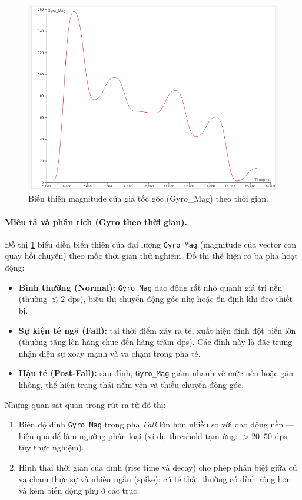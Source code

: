 \begin{figure}[H]
    \centering
    \includegraphics[width=0.95\linewidth]{figures/gyro_time.png}
    \caption{Biến thiên magnitude của gia tốc góc (Gyro\_Mag) theo thời gian.}
    \label{fig:gyro_time}
\end{figure}

\paragraph{Miêu tả và phân tích (Gyro theo thời gian).}
Đồ thị \ref{fig:gyro_time} biểu diễn biến thiên của đại lượng \texttt{Gyro\_Mag} (magnitude của vector con quay hồi chuyển) theo mốc thời gian thử nghiệm. Đồ thị thể hiện rõ ba pha hoạt động: 
\begin{itemize}
  \item \textbf{Bình thường (Normal):} \texttt{Gyro\_Mag} dao động rất nhỏ quanh giá trị nền (thường $\lesssim 2$ dps), biểu thị chuyển động góc nhẹ hoặc ổn định khi đeo thiết bị.
  \item \textbf{Sự kiện té ngã (Fall):} tại thời điểm xảy ra té, xuất hiện đỉnh đột biến lớn (thường tăng lên hàng chục đến hàng trăm dps). Các đỉnh này là đặc trưng nhận diện sự xoay mạnh và va chạm trong pha té.
  \item \textbf{Hậu té (Post-Fall):} sau đỉnh, \texttt{Gyro\_Mag} giảm nhanh về mức nền hoặc gần không, thể hiện trạng thái nằm yên và thiếu chuyển động góc.
\end{itemize}

Những quan sát quan trọng rút ra từ đồ thị:
\begin{enumerate}
  \item Biên độ đỉnh \texttt{Gyro\_Mag} trong pha \textit{Fall} lớn hơn nhiều so với dao động nền — hiệu quả để làm ngưỡng phân loại (ví dụ threshold tạm ứng: $>20$--$50$ dps tùy thực nghiệm).
  \item Hình thái thời gian của đỉnh (rise time và decay) cho phép phân biệt giữa cú va chạm thực sự và nhiễu ngắn (spike): cú té thật thường có đỉnh rộng hơn và kèm biến động phụ ở các trục.
\end{enumerate}

